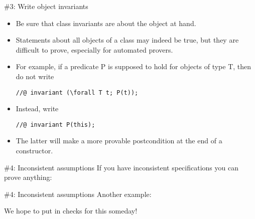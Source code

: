 \documentclass[
pdf,
nocolorBG,
slideColor,
cok,
]{prosper}
\newcommand{\verbatimcode}[1]{
\begin{figure*}
\tiny

\end{figure*}
}
\begin{document}
%%%%%%%%%%%%%%%%%%%%%%%%%%%%%%%%%%%%%%%%%%%%%%%%%%%%%%%%%%%%%%%%%%%%%%%%%%%%%

\begin{slide}{\#3: Write object invariants}
\vspace*{-6ex}
\begin{itemize}
\item Be sure that class invariants are about the object at hand.  
\item Statements about all objects of
a class may indeed be true, but they are difficult to prove, especially for automated provers.

\item For example, if a predicate P is supposed to hold for objects of type T, then do {\red not} write
\begin{verbatim}
//@ invariant (\forall T t; P(t));
\end{verbatim}

\item Instead, write
\begin{verbatim}
//@ invariant P(this);
\end{verbatim}

\item The latter will make a more provable postcondition at the end of a constructor.
\end{itemize}

\end{slide}


\begin{slide}{\#4: Inconsistent assumptions}
\vspace*{-3ex}
If you have inconsistent specifications you can prove anything:

\verbatimcode{examples/Inconsistent.java}
\end{slide}

\begin{slide}{\#4: Inconsistent assumptions}
\vspace*{-3ex}
Another example:

\verbatimcode{examples/Inconsistent2.java}

We hope to put in checks for this someday!

\end{slide}


\end{document}
